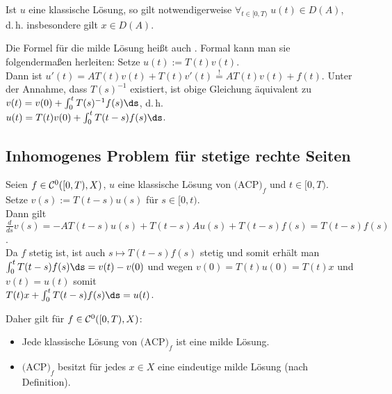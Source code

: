 \begin{Bem}
    Ist $u$ eine klassische Lösung, so gilt notwendigerweise
    $\forall_{t \in [0, T)}\; u(t) \in D(A)$, d.\,h. insbesondere gilt $x \in D(A)$.
\end{Bem}

\linie

\begin{Bem}
    Die Formel für die milde Lösung heißt auch .
    Formal kann man sie folgendermaßen herleiten:
    Setze $u(t) := T(t) v(t)$.\\
    Dann ist $u'(t) = AT(t)v(t) + T(t)v'(t) \overset{!}{=} AT(t)v(t) + f(t)$.
    Unter der Annahme, dass $T(s)^{-1}$ existiert, ist obige Gleichung äquivalent zu
    $v(t) = v(0) + \int_0^t T(s)^{-1} f(s)\ds$, d.\,h.\\
    $u(t) = T(t) v(0) + \int_0^t T(t - s) f(s)\ds$.
\end{Bem}

\pagebreak

\subsection{%
    Inhomogenes Problem für stetige rechte Seiten
}

\begin{Bem}
    Seien $f \in \mathcal{C}^0([0, T), X)$, $u$ eine klassische Lösung von $\text{(ACP)}_f$
    und $t \in [0, T)$.\\
    Setze $v(s) := T(t - s) u(s)$ für $s \in [0, t)$.\\
    Dann gilt $\frac{d}{ds} v(s) = -AT(t - s) u(s) + T(t - s) Au(s) + T(t - s) f(s) =
    T(t - s) f(s)$.\\
    Da $f$ stetig ist, ist auch $s \mapsto T(t - s) f(s)$ stetig und somit erhält man\\
    $\int_0^t T(t - s) f(s) \ds = v(t) - v(0)$ und wegen $v(0) = T(t)u(0) = T(t)x$ und $v(t) = u(t)$
    somit\\
    $T(t)x + \int_0^t T(t - s) f(s) \ds = u(t)$.

    Daher gilt für $f \in \mathcal{C}^0([0, T), X)$:
    \begin{itemize}
        \item
        Jede klassische Lösung von $\text{(ACP)}_f$ ist eine milde Lösung.

        \item
        $\text{(ACP)}_f$ besitzt für jedes $x \in X$ eine eindeutige milde Lösung
        (nach Definition).
    \end{itemize}
\end{Bem}

